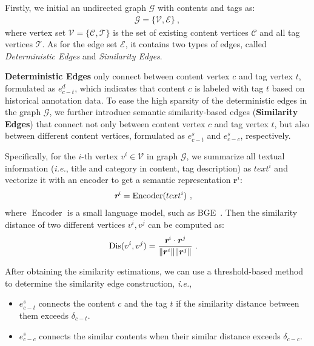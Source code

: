 Firstly, we initial an undirected graph $\mathcal{G}$ with contents and tags as:
\begin{equation}
\begin{aligned}
\mathcal{G}=\{\mathcal{V},\mathcal{E}\}~,
\end{aligned}
\end{equation}
where vertex set $\mathcal{V}=\{\mathcal{C},\mathcal{T}\}$ is the set of existing content vertices $\mathcal{C}$ and all tag vertices $\mathcal{T}$. As for the edge set $\mathcal{E}$, it contains two types of edges, called \textit{Deterministic Edges} and \textit{Similarity Edges}.


\textbf{Deterministic Edges} only connect between content vertex $c$ and tag vertex $t$, formulated as $e_{c-t}^d$, which indicates that content $c$ is labeled with tag $t$ based on historical annotation data.
To ease the high sparsity of the deterministic edges in the graph $\mathcal{G}$, we further introduce semantic similarity-based edges (\textbf{Similarity Edges}) that connect not only between content vertex $c$ and tag vertex $t$, but also between different content vertices, formulated as $e_{c-t}^s$ and $e_{c-c}^s$, respectively. 

Specifically, for the $i$-th vertex $v^i \in \mathcal{V}$ in graph $\mathcal{G}$, we summarize all textual information (\textit{i.e.}, title and category in content, tag description) as $text^{i}$ and vectorize it with an encoder to get a semantic representation $\boldsymbol{r}^i$:
\begin{equation}
\begin{aligned}
    \textit{\textbf{r}}^i &= \operatorname{Encoder}(text^{i})~,
\end{aligned}
\end{equation}
where $\operatorname{Encoder}$ is a small language model, such as BGE~\cite{bge}. Then the similarity distance of two different vertices $v^i, v^j$ can be computed as:
\begin{equation}
\begin{aligned}
    \operatorname{Dis}(v^i, v^j) &= \frac{\textit{\textbf{r}}^i\cdot\boldsymbol{r}^j}{\lVert\boldsymbol{r}^i\rVert \lVert\boldsymbol{r}^j\rVert}~.
\end{aligned}
\end{equation}

After obtaining the similarity estimations, we can use a threshold-based method to determine the similarity edge construction, \textit{i.e.},
\begin{itemize}[leftmargin=12pt]
    \item $e_{c-t}^s$ connects the content $c$ and the tag $t$ if the similarity distance between them exceeds $\delta_{c-t}$.
    \item $e_{c-c}^s$ connects the similar contents when their similar distance exceeds $\delta_{c-c}$.
\end{itemize}

